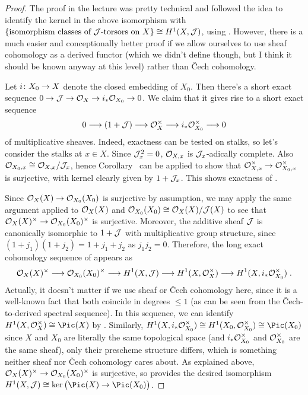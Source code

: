 \documentclass[a4paper,parskip=half,numbers=enddot, DIV=12]{scrreprt}
\renewcommand{\leq}{\leqslant}
\begin{document}
\begin{proof}
	The proof in the lecture was pretty technical and followed the idea to identify the kernel in the above isomorphism with $\left\{\text{isomorphism classes of }\mathcal{J}\text{-torsors on }X\right\}\cong H^1(X,\mathcal{J})$, using \cite[Proposition~1.7.1]{alggeo2}. However, there is a much easier and conceptionally better proof if we allow ourselves to use sheaf cohomology as a derived functor (which we didn't define though, but I think it should be known anyway at this level) rather than \v Cech cohomology.
	
	Let $i\colon X_0\morphism X$ denote the closed embedding of $X_0$. Then there's a short exact sequence $0\morphism\Jj\morphism \Oo_X\morphism i_*\Oo_{X_0}\morphism 0$. We claim that it gives rise to a short exact sequence
	\begin{align}\lbl{eq:multiplicativeSES}
		0\morphism(1+\Jj)\morphism \Oo_X^\times\morphism i_*\Oo_{X_0}^\times\morphism 0
	\end{align}
	of multiplicative sheaves. Indeed, exactness can be tested on stalks, so let's consider the stalks at $x\in X$. Since $\mathcal{J}_x^2=0$, $\mathcal{O}_{X,x}$ is $\mathcal{J}_x$-adically complete. Also $\mathcal{O}_{X_0,x}\cong \mathcal{O}_{X,x}/\mathcal{J}_x$, hence Corollary~ can be applied to show that $\Oo_{X,x}^\times\morphism \Oo_{X_0,x}^\times$ is surjective, with kernel clearly given by $1+\mathcal{J}_x$. This shows exactness of .
	
	Since $\Oo_X(X)\morphism \Oo_{X_0}(X_0)$ is surjective by assumption, we may apply the same argument applied to $\mathcal{O}_X(X)$ and $\mathcal{O}_{X_0}(X_0)\cong \mathcal{O}_X(X)/\mathcal{J}(X)$ to see that $\Oo_X(X)^\times\morphism\Oo_{X_0}(X_0)^\times$ is surjective. Moreover, the additive sheaf $\mathcal{J}$ is canonically isomorphic to $1+\mathcal{J}$ with multiplicative group structure, since $(1+j_1)(1+j_2)=1+j_1+j_2$ as $j_1j_2=0$. Therefore, the long exact cohomology sequence of  appears as
	\begin{align}\lbl{eq:multiplicativeCohoSeq}
		\Oo_X(X)^\times\morphism\Oo_{X_0}(X_0)^\times \morphism H^1(X,\Jj)\morphism H^1(X,\Oo_X^\times)\morphism H^1(X,i_*\Oo_{X_0}^\times)\;.
	\end{align}
	Actually, it doesn't matter if we use sheaf or \v Cech cohomology here, since it is a well-known fact that both coincide in degrees $\leq 1$ (as can be seen from the \v Cech-to-derived spectral sequence). In this sequence, we can identify $H^1(X,\Oo_X^\times)\cong \Pic(X)$ by \cite[Section~1.7]{alggeo2}. Similarly, $H^1(X,i_*\Oo_{X_0}^\times)\cong H^1(X_0,\Oo_{X_0}^\times)\cong \Pic(X_0)$ since $X$ and $X_0$ are literally the same topological space (and $i_*\mathcal{O}_{X_0}^\times$ and $\mathcal{O}_{X_0}^\times$ are the same sheaf), only their prescheme structure differs, which is something neither sheaf nor \v Cech cohomology cares about. As explained above, $\Oo_X(X)^\times\morphism\Oo_{X_0}(X_0)^\times$ is surjective, so  provides the desired isomorphism $H^1(X,\Jj)\cong\ker\big(\Pic(X)\morphism\Pic(X_0)\big)$.
	

\end{proof}
\end{document}
